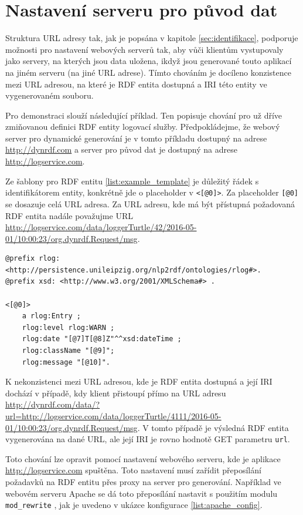 \documentclass[thesis=B,czech]{FITthesis}[2012/06/26]
\begin{document}
  \section{Nastavení serveru pro původ dat}
  Struktura URL adresy tak, jak je popsána v kapitole \ref{sec:identifikace}, podporuje možnosti pro nastavení webových serverů tak, aby 
  vůči klientům vystupovaly jako servery, na kterých jsou data uložena, ikdyž jsou generované touto aplikací na jiném serveru (na jiné URL adrese). Tímto chováním je docíleno konzistence
  mezi URL adresou, na které je RDF entita dostupná a IRI této entity ve vygenerovaném souboru.
  
  Pro demonstraci slouží následující příklad. Ten popisuje chování pro už dříve zmiňovanou definici RDF entity logovací služby. Předpokládejme, že webový server
  pro dynamické generování je v tomto příkladu dostupný na adrese \url{http://dynrdf.com} a server pro původ dat je dostupný na adrese\\ 
  \url{http://logservice.com}. 
  
  Ze šablony pro RDF entitu \ref{list:example_template} je důležitý řádek s identifikátorem entity, 
  konkrétně jde o placeholder v \texttt{<[@0]>}. Za placeholder \texttt{[@0]} se dosazuje celá URL adresa. Za URL adresu, kde má být přístupná požadovaná RDF entita
  nadále považujme URL \url{http://logservice.com/data/loggerTurtle/42/2016-05-01/10:00:23/org.dynrdf.Request/msg}. 
  

\begin{lstlisting}[float=htb,caption={Šablona RDF entity v Turtle formátu},label=list:example_template]
@prefix rlog: 
<http://persistence.unileipzig.org/nlp2rdf/ontologies/rlog#>.
@prefix xsd: <http://www.w3.org/2001/XMLSchema#> .

<[@0]> 
	a rlog:Entry ;
  	rlog:level rlog:WARN ;
	rlog:date "[@7]T[@8]Z"^^xsd:dateTime ;
	rlog:className "[@9]";
	rlog:message "[@10]".
\end{lstlisting}
  \newpage
  K nekonzistenci mezi URL adresou, kde je RDF entita dostupná a její IRI dochází v případě, kdy klient přistoupí přímo na URL adresu 
  \url{http://dynrdf.com/data/?url=http://logservice.com/data/loggerTurtle/4111/2016-05-01/10:00:23/org.dynrdf.Request/msg}.
  V tomto případě je výsledná RDF entita vygenerována na dané URL, ale její IRI je rovno hodnotě GET parametru \texttt{url}.
  
  Toto chování lze opravit pomocí nastavení webového serveru, kde je aplikace \url{http://logservice.com} spuštěna.
  Toto nastavení musí zařídit přeposílání požadavků na RDF entitu přes proxy na server pro generování. 
  Například ve webovém serveru Apache \cite{apache_httpd} se dá toto přeposílání nastavit
  s použitím modulu \texttt{mod\_rewrite} \cite{mod_rewrite}, jak je uvedeno v ukázce konfigurace \ref{list:apache_config}.
  
\end{document}
